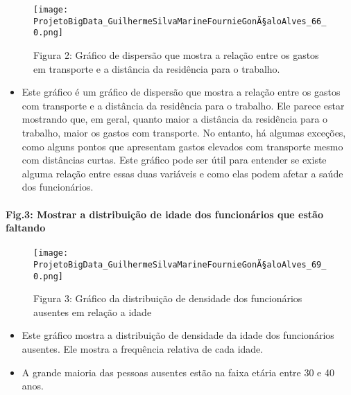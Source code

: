 \documentclass[11pt]{article}
\providecommand{\tightlist}{%
      \setlength{\itemsep}{0pt}\setlength{\parskip}{0pt}}
\begin{document}
\begin{figure}[h]
   \centering
   \texttt{[image: ProjetoBigData\_GuilhermeSilvaMarineFournieGonÃ§aloAlves\_66\_0.png]}
   \pagebreak
    \caption{Figura 2: Gráfico de dispersão que mostra a relação entre os
  gastos em transporte e a distância da residência para o trabalho.}
    \pagebreak
   \label{fig:dispresao}
\end{figure}

    \begin{itemize}
\tightlist
\item
  Este gráfico é um gráfico de dispersão que mostra a relação entre os
  gastos com transporte e a distância da residência para o trabalho. Ele
  parece estar mostrando que, em geral, quanto maior a distância da
  residência para o trabalho, maior os gastos com transporte. No
  entanto, há algumas exceções, como alguns pontos que apresentam gastos
  elevados com transporte mesmo com distâncias curtas. Este gráfico pode
  ser útil para entender se existe alguma relação entre essas duas
  variáveis e como elas podem afetar a saúde dos funcionários.
\end{itemize}


    \hypertarget{mostrar-a-distribuiuxe7uxe3o-de-idade-dos-funcionuxe1rios-que-estuxe3o-faltando}{%
\paragraph{Fig.3: Mostrar a distribuição de idade dos funcionários que estão
faltando}\label{mostrar-a-distribuiuxe7uxe3o-de-idade-dos-funcionuxe1rios-que-estuxe3o-faltando}}

\begin{figure}[h]
   \centering
   \texttt{[image: ProjetoBigData\_GuilhermeSilvaMarineFournieGonÃ§aloAlves\_69\_0.png]}
   \pagebreak
    \caption{Figura 3: Gráfico da distribuição de densidade dos
  funcionários ausentes em relação a idade}
    \pagebreak
   \label{fig:densidade}
\end{figure}
    
    \begin{itemize}
\tightlist
\item
  Este gráfico mostra a distribuição de densidade da idade dos
  funcionários ausentes. Ele mostra a frequência relativa de cada idade.
\item
  A grande maioria das pessoas ausentes estão na faixa etária entre 30 e
  40 anos.
\end{itemize}
\end{document}
